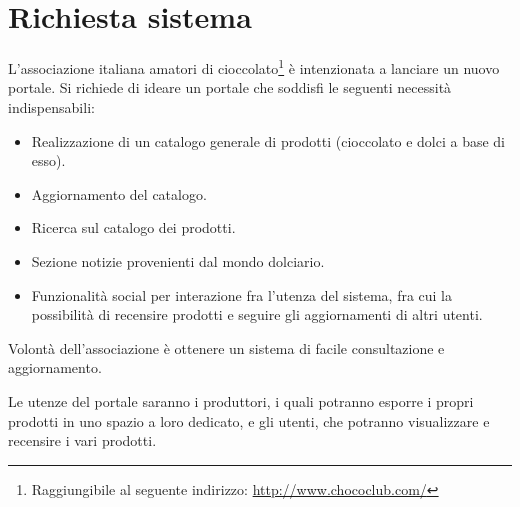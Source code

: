 \chapter{Richiesta sistema}

L’associazione italiana amatori di cioccolato\footnote{Raggiungibile al seguente indirizzo: \url{http://www.chococlub.com/}} è intenzionata a lanciare un nuovo portale.
Si richiede di ideare un portale che soddisfi le seguenti necessità indispensabili:
\begin{itemize}
    \item Realizzazione di un catalogo generale di prodotti (cioccolato e dolci a base di esso).
    \item Aggiornamento del catalogo.
    \item Ricerca sul catalogo dei prodotti.
    \item Sezione notizie provenienti dal mondo dolciario.
    \item Funzionalità social per interazione fra l'utenza del sistema, fra cui la possibilità di recensire prodotti e seguire gli aggiornamenti di altri utenti.
\end{itemize}
Volontà dell'associazione è ottenere un sistema di facile consultazione e aggiornamento.

Le utenze del portale saranno i produttori, i quali potranno esporre i propri prodotti in uno spazio a loro dedicato, e gli utenti, che potranno visualizzare e recensire i vari prodotti.

